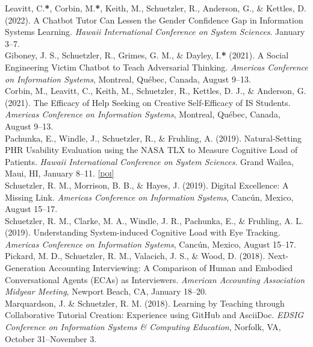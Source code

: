 \documentclass[10pt, letter]{article}
\newcommand{\doi}[1]{\href{#1}{\scriptsize\textsc{[doi]}}}
\newcommand{\years}[1]{\marginnote{\scriptsize #1}}
\begin{document}
\years{}Leavitt, C.\textbf{*}, Corbin, M.\textbf{*}, Keith, M., Schuetzler, R., Anderson, G., \& Kettles, D. (2022). A Chatbot Tutor Can Lessen the Gender Confidence Gap in Information Systems Learning. \emph{Hawaii International Conference on System Sciences}. January 3--7.\\

\years{2021}Giboney, J. S., Schuetzler, R., Grimes, G. M., \& Dayley, I.\textbf{*} (2021). A Social Engineering Victim Chatbot to Teach Adversarial Thinking. \emph{Americas Conference on Information Systems}, Montreal, Qu\'ebec, Canada, August 9--13.\\

\years{}Corbin, M., Leavitt, C., Keith, M., Schuetzler, R., Kettles, D. J., \& Anderson, G. (2021). The Efficacy of Help Seeking on Creative Self-Efficacy of IS Students. \emph{Americas Conference on Information Systems}, Montreal, Qu\'ebec, Canada, August 9--13.\\

\years{2019}Pachunka, E., Windle, J., Schuetzler, R., \& Fruhling, A. (2019). Natural-Setting PHR Usability Evaluation using the NASA TLX to Measure Cognitive Load of Patients. \emph{Hawaii International Conference on System Sciences}. Grand Wailea, Maui, HI, January 8--11. \doi{https://doi.org/10.24251/HICSS.2019.480}\\

\years{}Schuetzler, R. M., Morrison, B. B., \& Hayes, J. (2019). Digital Excellence: A Missing Link. \emph{Americas Conference on Information Systems}, Canc\'{u}n, Mexico, August 15--17.\\

\years{}Schuetzler, R. M., Clarke, M. A., Windle, J. R., Pachunka, E., \& Fruhling, A. L. (2019). Understanding System-induced Cognitive Load with Eye Tracking. \emph{Americas Conference on Information Systems}, Canc\'{u}n, Mexico, August 15--17.\\

\years{2018}Pickard, M. D., Schuetzler, R. M., Valacich, J. S., \& Wood, D. (2018).
Next-Generation Accounting Interviewing: A Comparison of Human and Embodied Conversational Agents (ECAs) as Interviewers.
\emph{American Accounting Association Midyear Meeting}, Newport Beach, CA, January 18--20.\\

\years{} Marquardson, J. \& Schuetzler, R. M. (2018).
Learning by Teaching through Collaborative Tutorial Creation: Experience using GitHub and AsciiDoc.
\emph{EDSIG Conference on Information Systems \& Computing Education}, Norfolk, VA, October 31--November 3.\\
\end{document}
